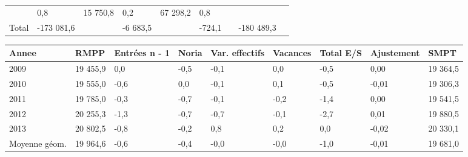 \begin{longtable}[]{@{}lllllllll@{}}
\begin{minipage}[t]{0.16\columnwidth}
\end{minipage} & \begin{minipage}[t]{0.06\columnwidth}\raggedright
0,8\strut
\end{minipage} & \begin{minipage}[t]{0.12\columnwidth}\raggedright
15 750,8\strut
\end{minipage} & \begin{minipage}[t]{0.06\columnwidth}\raggedright
0,2\strut
\end{minipage} & \begin{minipage}[t]{0.09\columnwidth}\raggedright
67 298,2\strut
\end{minipage} & \begin{minipage}[t]{0.06\columnwidth}\raggedright
0,8\strut
\end{minipage}\tabularnewline
\begin{minipage}[t]{0.05\columnwidth}\raggedright
Total\strut
\end{minipage} & \begin{minipage}[t]{0.10\columnwidth}\raggedright
-173 081,6\strut
\end{minipage} & \begin{minipage}[t]{0.06\columnwidth}\raggedright
\strut
\end{minipage} & \begin{minipage}[t]{0.16\columnwidth}\raggedright
-6 683,5\strut
\end{minipage} & \begin{minipage}[t]{0.06\columnwidth}\raggedright
\strut
\end{minipage} & \begin{minipage}[t]{0.12\columnwidth}\raggedright
-724,1\strut
\end{minipage} & \begin{minipage}[t]{0.06\columnwidth}\raggedright
\strut
\end{minipage} & \begin{minipage}[t]{0.09\columnwidth}\raggedright
-180 489,3\strut
\end{minipage} & \begin{minipage}[t]{0.06\columnwidth}\raggedright
\strut
\end{minipage}\tabularnewline
\bottomrule
\end{longtable}

\begin{longtable}[]{@{}lllllllll@{}}
\toprule
Annee & RMPP & Entrées n - 1 & Noria & Var. effectifs & Vacances & Total
E/S & Ajustement & SMPT\tabularnewline
\midrule
\endhead
2009 & 19 455,9 & 0,0 & -0,5 & -0,1 & 0,0 & -0,5 & 0,00 & 19
364,5\tabularnewline
2010 & 19 555,0 & -0,6 & 0,0 & -0,1 & 0,1 & -0,5 & -0,01 & 19
306,3\tabularnewline
2011 & 19 785,0 & -0,3 & -0,7 & -0,1 & -0,2 & -1,4 & 0,00 & 19
541,5\tabularnewline
2012 & 20 255,3 & -1,3 & -0,7 & -0,7 & -0,1 & -2,7 & 0,01 & 19
880,5\tabularnewline
2013 & 20 802,5 & -0,8 & -0,2 & 0,8 & 0,2 & 0,0 & -0,02 & 20
330,1\tabularnewline
Moyenne géom. & 19 964,6 & -0,6 & -0,4 & -0,0 & -0,0 & -1,0 & -0,01 & 19
681,0\tabularnewline
\bottomrule
\end{longtable}

